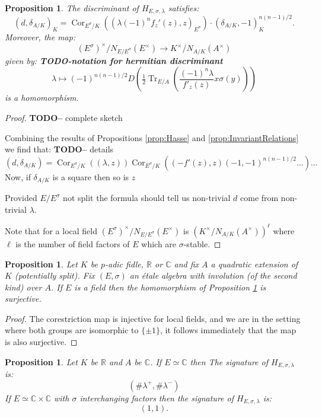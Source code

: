 \documentclass{article}
\theoremstyle{plain}
\newtheorem{proposition}[theorem]{Proposition}
\theoremstyle{definition}
\DeclareMathOperator{\Tr}{Tr}
\DeclareMathOperator{\Cor}{Cor}
\newcommand{\RR}{\mathbb{R}}
\newcommand{\CC}{\mathbb{C}}
\newcommand{\TODO}[1]{\textbf{TODO-#1}}
\begin{document}
\begin{proposition}\label{prop:discrimmap}
The discriminant of $H_{E,\sigma,\lambda}$ satisfies:
\[  (d,\delta_{A/K})_K =  \Cor_{E^\sigma/K}((\lambda (-1)^n f_z'(z), z)_{E^\sigma}) \cdot (\delta_{A/K},-1)_K^{n(n-1)/2}. \]
Moreover, the map:
\[ (E^\sigma)^\times/N_{E/E^\sigma}(E^\times) \rightarrow K^\times/N_{A/K}(A^\times) \]
given by:
\TODO{notation for hermitian discriminant}
\[ \lambda \mapsto (-1)^{n(n-1)/2} D\left( \tfrac{1}{2}\Tr_{E/A}\left( \frac{(-1)^n\lambda}{f'_z(z)} x\sigma(y) \right)\right) \]
is a homomorphism.
\end{proposition}
\begin{proof}
\TODO - complete sketch

Combining the results of Propositions \ref{prop:Hasse} and \ref{prop:InvariantRelations} we find that:
\TODO - details
\[ (d,\delta_{A/K}) =  \Cor_{E^\sigma/K}((\lambda,z)) \Cor_{E^\sigma/K}((-f'(z),z) (-1,-1)^{n(n-1)/2}...) ... \]
Now, if $\delta_{A/K}$ is a square then so is $z$

Provided $E/E^\sigma$ not split the formula should tell us non-trivial $d$ come from non-trivial $\lambda$.

Note that for a local field $(E^\sigma)^\times/N_{E/E^\sigma}(E^\times)$ is $( K^\times/N_{A/K}(A^\times))^\ell$ where $\ell$ is the number of field factors of $E$ which are $\sigma$-stable.
\end{proof}

\begin{proposition}\label{prop:discrimmapsurjective}
Let $K$ be $p$-adic fidle, $\RR$ or $\CC$ and fix $A$ a quadratic extension of $K$ (potentially split).
Fix $(E,\sigma)$ an \'etale algebra with involution (of the second kind) over $A$.
If $E$ is a field then the homomorphism of Proposition \ref{prop:discrimmap} is surjective.
\end{proposition}
\begin{proof}
The corestriction map is injective for local fields, and we are in the setting where both groups are isomorphic to $\{\pm1\}$, it follows immediately that the map is also surjective.
\end{proof}

\begin{proposition}\label{prop:signature}
Let $K$ be $\RR$ and $A$ be $\CC$.
If $E \simeq \CC$ then
The signature of $H_{E,\sigma,\lambda}$ is:
\[ (\#\lambda^+,\#\lambda^-) \]
If $E\simeq \CC\times\CC$ with $\sigma$ interchanging factors then the signature of $H_{E,\sigma,\lambda}$ is:
\[ (1,1). \]
\end{proposition}
\end{document}
